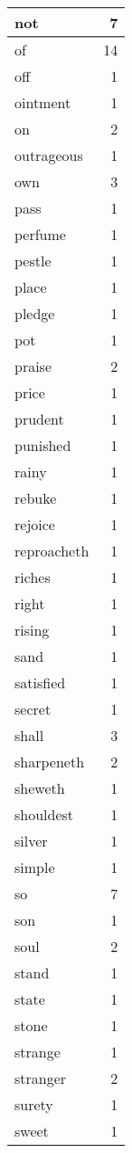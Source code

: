 \begin{center}
\begin{longtable}{l|r}
not & 7\\ \hline 
of & 14\\ \hline 
off & 1\\ \hline 
ointment & 1\\ \hline 
on & 2\\ \hline 
outrageous & 1\\ \hline 
own & 3\\ \hline 
pass & 1\\ \hline 
perfume & 1\\ \hline 
pestle & 1\\ \hline 
place & 1\\ \hline 
pledge & 1\\ \hline 
pot & 1\\ \hline 
praise & 2\\ \hline 
price & 1\\ \hline 
prudent & 1\\ \hline 
punished & 1\\ \hline 
rainy & 1\\ \hline 
rebuke & 1\\ \hline 
rejoice & 1\\ \hline 
reproacheth & 1\\ \hline 
riches & 1\\ \hline 
right & 1\\ \hline 
rising & 1\\ \hline 
sand & 1\\ \hline 
satisfied & 1\\ \hline 
secret & 1\\ \hline 
shall & 3\\ \hline 
sharpeneth & 2\\ \hline 
sheweth & 1\\ \hline 
shouldest & 1\\ \hline 
silver & 1\\ \hline 
simple & 1\\ \hline 
so & 7\\ \hline 
son & 1\\ \hline 
soul & 2\\ \hline 
stand & 1\\ \hline 
state & 1\\ \hline 
stone & 1\\ \hline 
strange & 1\\ \hline 
stranger & 2\\ \hline 
surety & 1\\ \hline 
sweet & 1\\ \hline 

\end{longtable}
\end{center}
